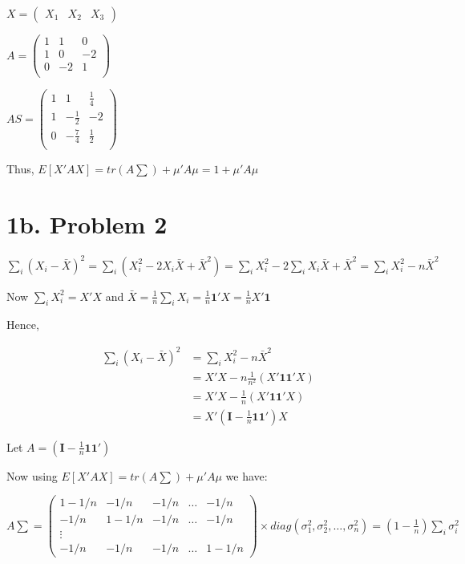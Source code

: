 \documentclass[a4paper]{article}
\begin{document}
$X=\begin{pmatrix}X_1 & X_2 & X_3\end{pmatrix}$

$A = \begin{pmatrix}
1 & 1 & 0\\
1 & 0 & -2\\
0 & -2 & 1\\
\end{pmatrix}$


$AS = \begin{pmatrix}
1 & 1 & \frac{1}{4}\\
1 & -\frac{1}{2} & -2\\
0 & -\frac{7}{4} & \frac{1}{2}\\
\end{pmatrix}$


Thus, $E[X'AX] = tr(A\sum) + \mu'A\mu = 1 + \mu'A\mu$

\section*{1b. Problem 2}

$\sum_i(X_i-\bar{X})^2 = \sum_i (X_i^2-2X_i\bar{X}+\bar{X}^2) = \sum_i X_i^2 -2\sum_i X_i \bar{X} + \bar{X}^2 = \sum_i X_i^2 -n\bar{X}^2$

Now $\sum_iX_i^2 = X'X$ and $\bar{X} = \frac{1}{n}\sum_i X_i = \frac{1}{n} \mathbf{1'}X = \frac{1}{n}X'\mathbf{1} $

Hence,

\begin{align*}
\sum_i(X_i-\bar{X})^2 &= \sum_i X_i^2-n\bar{X}^2\\
&= X'X - n\frac{1}{n^2}(X'\mathbf{11'}X)\\
&= X'X-\frac{1}{n}(X'\mathbf{11'}X)\\
&= X'(\mathbf{I}-\frac{1}{n}\mathbf{11'})X
\end{align*}

Let $A=(\mathbf{I}-\frac{1}{n}\mathbf{11'})$

Now using $E[X'AX]= tr(A\sum) + \mu'A\mu$ we have:

$A\sum = \begin{pmatrix}1-1/n & -1/n & -1/n & \dots & -1/n\\
-1/n & 1-1/n & -1/n & \dots & -1/n\\
\vdots\\
-1/n & -1/n & -1/n & \dots & 1-1/n
\end{pmatrix}\times diag(\sigma_1^2, \sigma_2^2, \dots, \sigma_n^2) = (1-\frac{1}{n})\sum_i \sigma_i^2$
\end{document}
